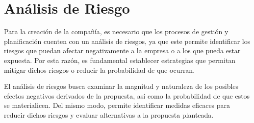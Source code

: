 \cleardoublepage 
{}
\section*{Análisis de Riesgo}

Para la creación de la compañía, es necesario que los procesos de gestión y planificación cuenten con un análisis de riesgos, ya que este permite identificar los riesgos que puedan afectar negativamente a la empresa o a los que pueda estar expuesta. Por esta razón, es fundamental establecer estrategias que permitan mitigar dichos riesgos o reducir la probabilidad de que ocurran.

El análisis de riesgos busca examinar la magnitud y naturaleza de los posibles efectos negativos derivados de la propuesta, así como la probabilidad de que estos se materialicen. Del mismo modo, permite identificar medidas eficaces para reducir dichos riesgos y evaluar alternativas a la propuesta planteada.







